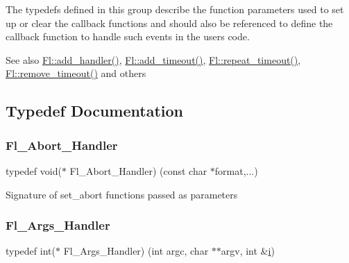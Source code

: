 The typedefs defined in this group describe the function parameters used to set up or clear the callback functions and should also be referenced to define the callback function to handle such events in the user\textquotesingle{}s code.

\begin{DoxySeeAlso}{See also}
\hyperlink{group__fl__events_ga04759d795ad0df6d5ee19e82aa92b3ec}{Fl\+::add\+\_\+handler()}, \hyperlink{class_fl_a6a7f66c2bb04c04cb5252c0466f87022}{Fl\+::add\+\_\+timeout()}, \hyperlink{class_fl_af37afc5d555c5b213023d7a26cae1706}{Fl\+::repeat\+\_\+timeout()}, \hyperlink{class_fl_ad22be36baba9f4f3396aeed4c91fb257}{Fl\+::remove\+\_\+timeout()} and others 
\end{DoxySeeAlso}


\subsection{Typedef Documentation}
\mbox{\label{group__callback__functions_gab06d501e53b8fe82de6d70937fb22f95}} 
\subsubsection{\texorpdfstring{Fl\+\_\+\+Abort\+\_\+\+Handler}{Fl\_Abort\_Handler}}
{\footnotesize\ttfamily typedef void($\ast$ Fl\+\_\+\+Abort\+\_\+\+Handler) (const char $\ast$format,...)}

Signature of set\+\_\+abort functions passed as parameters \mbox{\label{group__callback__functions_ga6cb5354ccaa2a6619f2408dbb5203f3b}} 
\subsubsection{\texorpdfstring{Fl\+\_\+\+Args\+\_\+\+Handler}{Fl\_Args\_Handler}}
{\footnotesize\ttfamily typedef int($\ast$ Fl\+\_\+\+Args\+\_\+\+Handler) (int argc, char $\ast$$\ast$argv, int \&\hyperlink{forms_8_h_acb559820d9ca11295b4500f179ef6392}{i})}

